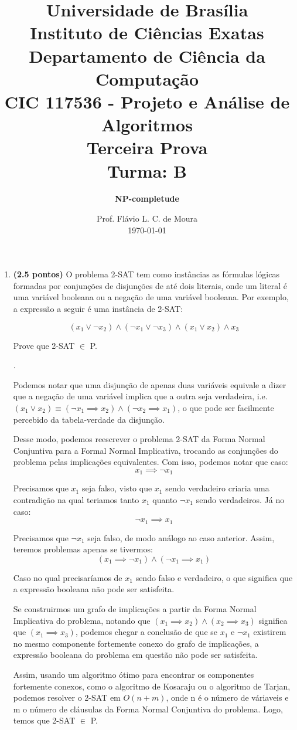 \documentclass[12pt]{article}
\title{{\large Universidade de Brasília \\ Instituto de Ciências Exatas \\
    Departamento de Ciência da Computação} \\[1cm]
  CIC 117536 - Projeto e Análise de Algoritmos \\[.5cm]  Terceira Prova \\[.5cm] Turma: B}
\author{{\bf NP-completude}}
\date{Prof. Flávio L. C. de Moura \\[.5cm] \today}
\newcommand{\resposta}[1]{ \noindent {\bf Solução}.{\color{blue} #1}}
\begin{document}
\maketitle

\begin{enumerate}
\item {\bf (2.5 pontos)} O problema 2-SAT tem como instâncias as
  fórmulas lógicas formadas por conjunções de disjunções de até dois
  literais, onde um literal é uma variável booleana ou a negação de
  uma variável booleana. Por exemplo, a expressão a seguir é uma
  instância de 2-SAT:

  $$(x_1\lor \neg x_2)\land (\neg x_1 \lor \neg x_3) \land (x_1 \lor x_2) \land x_3$$

  Prove que 2-SAT $\in$ P.

  
  \resposta{
    Podemos notar que uma disjunção de apenas duas variáveis equivale a dizer
    que a negação de uma variável implica que a outra seja verdadeira, i.e.
    $(x_1 \lor x_2)\equiv (\neg x_1 \implies x_2)\land (\neg x_2 \implies x_1)$,
    o que pode ser facilmente percebido da tabela-verdade da disjunção.

    Desse modo, podemos reescrever o problema 2-SAT da Forma Normal Conjuntiva
    para a Formal Normal Implicativa, trocando as conjunções do problema pelas
    implicações equivalentes. Com isso, podemos notar que caso:
    $$x_1 \implies \neg x_1$$

    Precisamos que $x_1$ seja falso, visto que $x_1$ sendo
    verdadeiro criaria uma contradição na qual teriamos tanto $x_1$ quanto
    $\neg x_1$ sendo verdadeiros. Já no caso:
    $$\neg x_1 \implies x_1$$

    Precisamos que $\neg x_1$ seja falso, de modo análogo ao caso anterior.
    Assim, teremos problemas apenas se tivermos:
    $$(x_1 \implies \neg x_1) \land (\neg x_1 \implies x_1)$$

    Caso no qual precisaríamos de $x_1$ sendo falso e verdadeiro, o que
    significa que a expressão booleana não pode ser satisfeita.

    Se construirmos um grafo de implicações a partir da Forma Normal
    Implicativa do problema, notando que $(x_1 \implies x_2) \land
    (x_2 \implies x_3)$ significa que $(x_1 \implies x_3)$, podemos
    chegar a conclusão de que se $x_1$ e $\neg x_1$ existirem no mesmo
    componente fortemente conexo do grafo de implicações, a expressão
    booleana do problema em questão não pode ser satisfeita.

    Assim, usando um algoritmo ótimo para encontrar os componentes fortemente
    conexos, como o algoritmo de Kosaraju ou o algoritmo de Tarjan, podemos
    resolver o 2-SAT em $O(n+m)$, onde n é o número de váriaveis e m o número
    de cláusulas da Forma Normal Conjuntiva do problema. Logo, temos que
    2-SAT $\in$ P.
  }
  

\end{enumerate}
\end{document}

